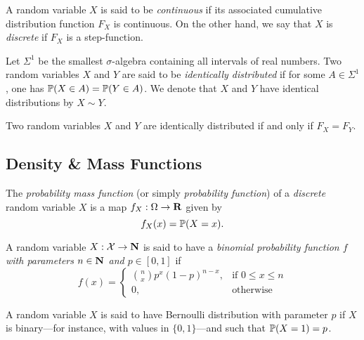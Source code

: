 \begin{definition}
\label{def:continuity-discreteness-random-variable}
A random variable \(X\) is said to be \emph{continuous} if its associated
cumulative distribution function \(F_X\) is continuous. On the other hand, we
say that \(X\) is \emph{discrete} if \(F_X\) is a step-function.
\end{definition}

\begin{definition}
\label{def:identically-distributed-random-variables}
Let \(\Sigma^1\) be the smallest \(\sigma\)-algebra containing all intervals of
real numbers. Two random variables \(X\) and \(Y\) are said to be
\emph{identically distributed} if for some \(A \in \Sigma^1\), one has
\(\operatorname{\mathbb{P}}(X \in A) = \operatorname{\mathbb{P}}(Y \in A)\). We denote that \(X\) and \(Y\) have
identical distributions by \(X \sim Y\).
\end{definition}

\begin{theorem}
\label{thm:random-variables-identical-iff-equal-cdfs}
Two random variables \(X\) and \(Y\) are identically distributed if and only if
\(F_X = F_Y\).
\end{theorem}

\subsection{Density \& Mass Functions}

\begin{definition}
\label{def:probability-mass-function}
The \emph{probability mass function} (or simply \emph{probability function})
of a \emph{discrete} random variable \(X\) is a map \(f_X: \Omega \to \mathbf{R}\) given
by
\[
f_X(x) = \operatorname{\mathbb{P}}(X = x).
\]
\end{definition}

\begin{definition}
\label{def:binomial-distribution}
A random variable \(X: \mathcal{X} \to \mathbf{N}\) is said to have a
\emph{binomial probability function \(f\) with parameters \(n \in \mathbf{N}\) and
  \(p \in [0, 1]\)} if
\[
f(x) =
\begin{cases}
  \binom{n}{x} p^x (1 - p)^{n - x}, &\text{if } 0 \leq x \leq n \\
  0, &\text{otherwise}
\end{cases}
\]
\end{definition}

\begin{definition}
\label{def:bernoulli-random-variable}
A random variable \(X\) is said to have Bernoulli distribution with parameter
\(p\) if \(X\) is binary---for instance, with values in \(\{0, 1\}\)---and such
that \(\operatorname{\mathbb{P}}(X = 1) = p\).
\end{definition}

